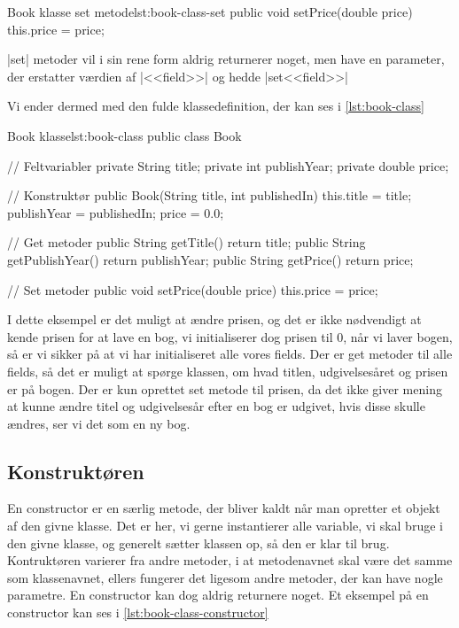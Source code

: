 \begin{JavaCode}{Book klasse set metode}{lst:book-class-set}
	public void setPrice(double price) {
		this.price = price;
	}
\end{JavaCode}

\JavaInline|set| metoder vil i sin rene form aldrig returnerer noget,
men have en parameter, der erstatter værdien af \JavaInline|<<field>>|
og hedde \JavaInline|set<<field>>|

Vi ender dermed med den fulde klassedefinition, der kan ses i
\autoref{lst:book-class}

\begin{JavaCode}{Book klasse}{lst:book-class}
	public class Book {

		// Feltvariabler
		private String title;
		private int publishYear;
		private double price;

		// Konstruktør
		public Book(String title, int publishedIn) {
			this.title  = title;
			publishYear = publishedIn;
			price       = 0.0;
		}

		// Get metoder
		public String getTitle() {
			return title;
		}
		public String getPublishYear() {
			return publishYear;
		}
		public String getPrice() {
			return price;
		}

		// Set metoder
		public void setPrice(double price) {
			this.price = price;
		}
	}
\end{JavaCode}

I dette eksempel er det muligt at ændre prisen, og det er ikke
nødvendigt at kende prisen for at lave en bog, vi initialiserer dog
prisen til 0, når vi laver bogen, så er vi sikker på at vi har
initialiseret alle vores fields. Der er get metoder til alle fields,
så det er muligt at spørge klassen, om hvad titlen, udgivelsesåret og
prisen er på bogen. Der er kun oprettet set metode til prisen, da det
ikke giver mening at kunne ændre titel og udgivelsesår efter en bog er
udgivet, hvis disse skulle ændres, ser vi det som en ny bog.

\subsection{Konstruktøren}

En constructor er en særlig metode, der bliver kaldt når man opretter
et objekt af den givne klasse. Det er her, vi gerne instantierer alle
variable, vi skal bruge i den givne klasse, og generelt sætter klassen
op, så den er klar til brug. Kontruktøren varierer fra andre metoder,
i at metodenavnet skal være det samme som klassenavnet, ellers
fungerer det ligesom andre metoder, der kan have nogle parametre. En
constructor kan dog aldrig returnere noget. Et eksempel på en
constructor kan ses i \autoref{lst:book-class-constructor}

